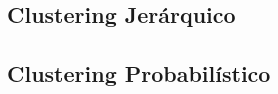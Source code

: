 \documentclass{article}
\begin{document}
\subsection{Clustering Jerárquico}


\subsection{Clustering Probabilístico}

\end{document}

